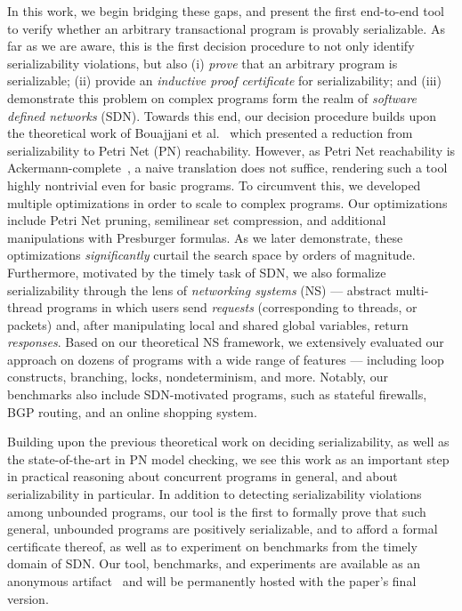 In this work, we begin bridging these gaps, and present the first end-to-end tool to verify whether an arbitrary transactional program is provably serializable.
As far as we are aware, this is the first decision procedure to not only identify serializability violations, but also (i) \textit{prove} that an arbitrary program is serializable; (ii) provide an \textit{inductive proof certificate} for serializability; and (iii) demonstrate this problem on complex programs form the realm of \textit{software defined networks} (SDN).
%
Towards this end, our decision procedure builds upon the theoretical work of Bouajjani et al.~\cite{BoEmEnHa13} which presented a reduction from serializability to Petri Net (PN) reachability.  However, as Petri Net reachability is Ackermann-complete~\cite{CzWo22}, a naive translation does not suffice, rendering such a tool highly nontrivial even for basic programs. To circumvent this, we developed multiple optimizations in order to scale to complex programs. 
Our optimizations include Petri Net pruning, semilinear set compression, and additional manipulations with Presburger formulas.
As we later demonstrate, these optimizations \textit{significantly} curtail the search space by orders of magnitude.
%
Furthermore, motivated by the timely task of SDN, 
we also formalize serializability through the lens of \textit{networking systems} (NS) --- abstract multi-thread programs in which users send \textit{requests} (corresponding to threads, or packets) and, after manipulating local and shared global variables, return \textit{responses}.
Based on our theoretical NS framework, we extensively evaluated our approach on dozens of programs with a wide range of features --- including loop constructs, branching, locks, nondeterminism, and more. Notably, our benchmarks also include SDN-motivated programs, such as stateful firewalls, BGP routing, and an online shopping system.


Building upon the previous theoretical work on deciding serializability, as well as the state-of-the-art in PN model checking, we see this work as an important step in practical reasoning about concurrent programs in general, and about serializability in particular.
In addition to detecting serializability violations among unbounded programs, our tool is the first to formally prove that such general, unbounded programs are positively serializable, and to afford a formal certificate thereof, as well as to experiment on benchmarks from the timely domain of SDN.
Our tool, benchmarks, and experiments are available as an anonymous artifact~\cite{ArtifactRepository} and will be permanently hosted with the paper’s final version.

